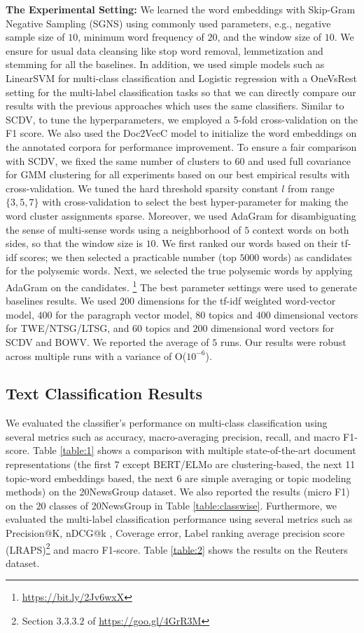 \documentclass{ecai}
\begin{document}
\vspace{0.5em}
\noindent \textbf{The Experimental Setting: }We learned the word embeddings with Skip-Gram Negative Sampling (SGNS) using commonly used parameters, e.g., negative sample size of $10$, minimum word frequency of $20$, and the window size of $10$. We ensure for usual data cleansing like stop word removal, lemmetization and stemming for all the baselines. In addition, we used simple models such as LinearSVM for multi-class classification and Logistic regression with a OneVsRest setting for the multi-label classification tasks so that we can directly compare our results with the previous approaches which uses the same classifiers. Similar to SCDV, to tune the hyperparameters, we employed a 5-fold cross-validation on the F1 score. We also used the Doc2VecC model \cite{chen2017efficient} to initialize the word embeddings on the annotated corpora for performance improvement. To ensure a fair comparison with SCDV, we fixed the same number of clusters to $60$ and used full covariance for GMM clustering for all experiments based on our best empirical results with cross-validation. We tuned the hard threshold sparsity constant $l$ from range $\{3,5,7\}$ with cross-validation to select the best hyper-parameter for making the word cluster assignments sparse. Moreover, we used AdaGram \cite{bartunov2016breaking} for disambiguating the sense of multi-sense words using a neighborhood of $5$ context words on both sides, so that the window size is $10$. We first ranked our words based on their tf-idf scores; we then selected a practicable number (top $5000$ words) as candidates for the polysemic words. Next, we selected the true polysemic words by applying AdaGram on the candidates. \footnote{\url{https://bit.ly/2Jv6wxX}} The best parameter settings were used to generate baselines results. We used $200$ dimensions for the tf-idf weighted word-vector model, $400$ for the paragraph vector model, $80$ topics and $400$ dimensional vectors for TWE/NTSG/LTSG, and $60$ topics and $200$ dimensional word vectors for SCDV and BOWV. We reported the average of $5$ runs. Our results were robust across multiple runs with a variance of O($10^{-6}$).

\subsection{Text Classification Results} We evaluated the classifier's performance on multi-class classification using several metrics such as accuracy, macro-averaging precision, recall, and macro F1-score. Table \ref{table:1} shows a comparison with multiple state-of-the-art document representations (the first 7 except BERT/ELMo are clustering-based, the next 11 topic-word embeddings based, the next 6 are simple averaging or topic modeling methods) on the 20NewsGroup dataset. We also reported the results (micro F1) on the $20$ classes of 20NewsGroup in Table \ref{table:classwise}. Furthermore, we evaluated the multi-label classification performance using several metrics such as Precision@K, nDCG@k \cite{bhatia2015sparse}, Coverage error, Label ranking average precision score (LRAPS)\footnote{Section $3.3.3.2$ of \url{https://goo.gl/4GrR3M}} and macro F1-score. Table \ref{table:2} shows the results on the Reuters dataset.
\end{document}
